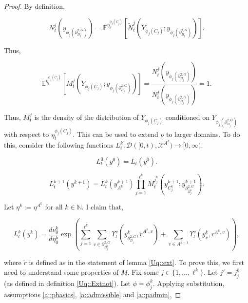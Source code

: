 \documentclass[12pt]{article}
\newcommand{\mb}{\mathbb}
\newcommand{\mc}{\mathcal}
\newcommand{\ra}{\rightarrow}
\newcommand{\ov}{\overline}
\newcommand{\exmu}[2]{\mb{E}^{#1}\left[#2\right]}	%
\newcommand{\defeq}{:=}								%
\newcommand{\cad}{\mc{D}}							%
\newcommand{\sta}{\mc{X}}							%
\newcommand{\dgneigh}[2]{\partial^{2,#1}_{#2}}		%
\newcommand{\cl}[1]{\ov{#1}}						%
\newcommand{\indx}[1]{^{#1}}						%
\newcommand{\rate}{r}								%
\newcommand{\xg}{y}									%
\newcommand{\vind}[1]{_{#1}}						%
\newcommand{\vpara}[1]{^{#1}}						%
\newcommand{\stpara}[1]{_{#1}}						%
\newcommand{\tpara}[1]{_{#1}}						%
\newcommand{\gvpara}[2]{^{#1,#2}}					%
\newcommand{\psize}{\ell}							%
\newcommand{\Xg}{Y}									%
\newcommand{\brate}{\alt{\rate}}					%
\newcommand{\alt}[1]{\tilde{#1}}					%
\newcommand{\mm}{\nu}								%
\newcommand{\mmm}{\eta}								%
\newcommand{\ds}{\Upsilon}							%
\newcommand{\dense}{L}								%
\newcommand{\densen}{N}								%
\newcommand{\denseph}{\alt{N}}						%
\newcommand{\mdense}{M}								%
\newcommand{\jpara}[1]{^{#1}}						%
\begin{document}
\begin{proof}
By definition, 

\[\densen\jpara{j}\tpara{t}(\xg\vind{\phi_j(\dgneigh{G}{B_j})}) = \exmu{\mmm\vpara{\phi_j(C_j)}\tpara{t}}{\denseph\jpara{j}\tpara{t}(\Xg\vind{\phi_j(C_j)};\xg\vind{\phi_j(\dgneigh{G}{B_j})})}.\]

Thus,

\[\exmu{\mmm\vpara{\phi_j(C_j)}\tpara{t}}{\mdense\jpara{j}\tpara{t}(\Xg\vind{\phi_j(C_j)};\xg\vind{\phi_j(\dgneigh{G}{B_j})})} = \frac{\densen\jpara{j}\tpara{t}(\xg\vind{\phi_j(\dgneigh{G}{B_j})})}{\densen\jpara{j}\tpara{t}(\xg\vind{\phi_j(\dgneigh{G}{B_j})})} = 1.\]

Thus, \(\mdense\jpara{j}\tpara{t}\) is the density of the distribution of \(\Xg\vind{\phi_j(C_j)}\) conditioned on \(\Xg\vind{\phi_j(\dgneigh{G}{B_j})}\) with respect to \(\mmm\vpara{\phi_j(C_j)}\tpara{t}\). This can be used to extend \(\mm\) to larger domains. To do this, consider the following functions \(\dense\indx{k}\tpara{t}: \cad([0,t),\sta^{A\indx{k}}) \ra [0,\infty)\):

\[\dense\indx{0}\tpara{t}(\xg\indx{0}) = \dense\tpara{t}(\xg\indx{0}).\]

\[\dense\indx{k+1}\tpara{t}(\xg\indx{k+1}) = \dense\indx{k}\tpara{t}(\xg\indx{k+1}\vind{A\indx{k}})\prod_{j=1}^{\psize\indx{k}}\mdense\jpara{j\indx{k}_j}\tpara{t}\left(\xg\indx{k+1}\vind{C_j\indx{k}};\xg\indx{k+1}\vind{\dgneigh{G}{B\indx{k}_j}}\right).\]

Let \(\mmm\indx{k} \defeq \mmm\vpara{A\indx{k}}\) for all \(k\in \mb{N}\). I claim that,

\[\dense\indx{k}\tpara{t}(\xg\indx{k}) = \frac{d\mm\indx{k}\tpara{0}}{d\mmm\indx{k}\tpara{0}}\exp\left(\sum_{j=1}^{\psize\indx{k}}\sum_{v\in \dgneigh{G}{B_j\indx{k}}} \ds\vpara{v}\tpara{t}\left(\xg\indx{k}\vind{\dgneigh{G}{B_j}},\brate\gvpara{A\indx{k}}{v}\stpara{\cdot}\right) + \sum_{v \in A\indx{k-1}} \ds\vpara{v}\tpara{t}\left(\xg\indx{k}\vind{\cl{v}},\rate\gvpara{A\indx{k}}{v}\stpara{\cdot}\right)\right),\]

where \(\brate\) is defined as in the statement of lemma \ref{Uq::ext}. To prove this, we first need to understand some properties of \(\mdense\). Fix some \(j \in \{1,\dots,\psize\indx{k}\}\). Let \(j' = j\indx{k}_j\) (as defined in definition \ref{Uq::Extnot}). Let \(\phi = \phi\indx{k}_j\). Applying substitution, assumptions \ref{a::pbasics}, \ref{a::admissible} and \ref{a::padmin},


\end{proof}
\end{document}
